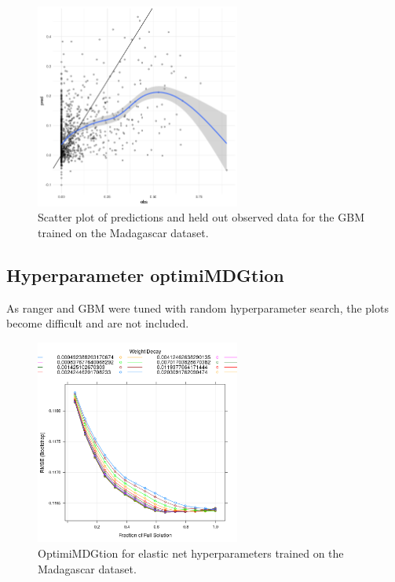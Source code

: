 \documentclass[review]{elsarticle}
\begin{document}
\begin{figure}[h!]
  \centering
  \includegraphics[width=0.6\textwidth]{figs/SI/xgboost_obspred_mdg.png}
\caption{
  Scatter plot of predictions and held out observed data for the GBM trained on the Madagascar dataset.
}

\end{figure}


\clearpage
\subsection{Hyperparameter optimiMDGtion}

As ranger and GBM were tuned with random hyperparameter search, the plots become difficult and are not included.


\begin{figure}[h!]
  \centering
  \includegraphics[width=0.6\textwidth]{figs/SI/enetopt_mdg.png}
\caption{
  OptimiMDGtion for elastic net hyperparameters trained on the Madagascar dataset.
}
\end{figure}
\end{document}
